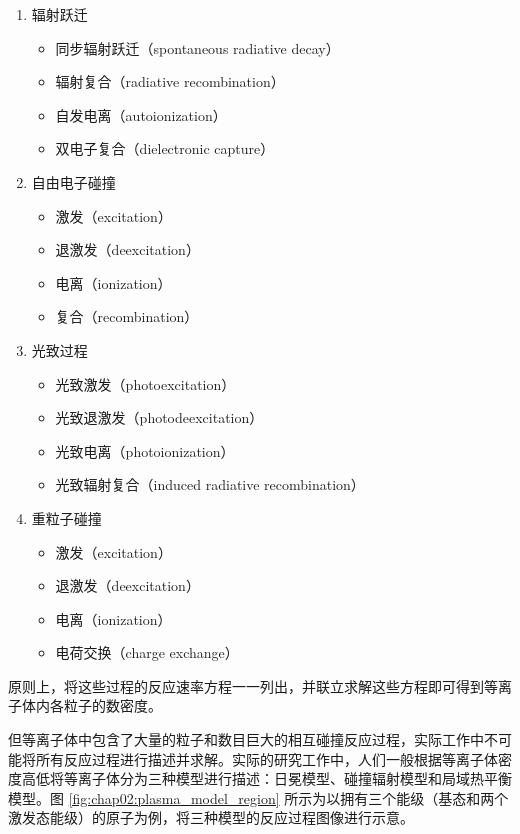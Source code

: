 \begin{enumerate}
  \item 辐射跃迁
    \begin{itemize}
      \item 同步辐射跃迁（spontaneous radiative decay）
      \item 辐射复合（radiative recombination）
      \item 自发电离（autoionization）
      \item 双电子复合（dielectronic capture）
    \end{itemize}
  \item 自由电子碰撞
    \begin{itemize}
      \item 激发（excitation）
      \item 退激发（deexcitation）
      \item 电离（ionization）
      \item 复合（recombination）
    \end{itemize}
  \item 光致过程
    \begin{itemize}
      \item 光致激发（photoexcitation）
      \item 光致退激发（photodeexcitation）
      \item 光致电离（photoionization）
      \item 光致辐射复合（induced radiative recombination）
    \end{itemize}
  \item 重粒子碰撞
    \begin{itemize}
      \item 激发（excitation）
      \item 退激发（deexcitation）
      \item 电离（ionization）
      \item 电荷交换（charge exchange）
    \end{itemize}
\end{enumerate}

原则上，将这些过程的反应速率方程一一列出，并联立求解这些方程即可得到等离子体内各粒子的数密度。

但等离子体中包含了大量的粒子和数目巨大的相互碰撞反应过程，实际工作中不可能将所有反应过程进行描述并求解。实际的研究工作中，人们一般根据等离子体密度高低将等离子体分为三种模型进行描述：日冕模型、碰撞辐射模型和局域热平衡模型。图 \ref{fig:chap02:plasma_model_region} 所示为以拥有三个能级（基态和两个激发态能级）的原子为例，将三种模型的反应过程图像进行示意。

